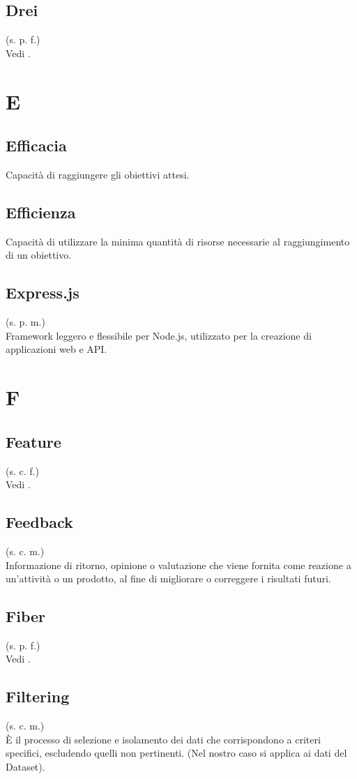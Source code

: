 \subsection{Drei}
(s. p. f.)\\
Vedi .
\pagebreak
\section{E}
\subsection{Efficacia}
Capacità di raggiungere gli obiettivi attesi.
\subsection{Efficienza}
Capacità di utilizzare la minima quantità di risorse necessarie al
raggiungimento di un obiettivo.
\subsection{Express.js}
(s. p. m.)\\
Framework leggero e flessibile per Node.js, utilizzato per la creazione di
applicazioni web e API.
\pagebreak
\section{F}
\subsection{Feature}
(s. c. f.)\\
Vedi .
\subsection{Feedback}
(s. c. m.)\\
Informazione di ritorno, opinione o valutazione che viene fornita come reazione a
un'attività o un prodotto, al fine di migliorare o correggere i risultati futuri.
\subsection{Fiber}
(s. p. f.)\\
Vedi .
\subsection{Filtering}
(s. c. m.)\\
È il processo di selezione e isolamento dei dati che corrispondono a criteri specifici, escludendo quelli non pertinenti. (Nel nostro caso si applica ai dati del Dataset).

